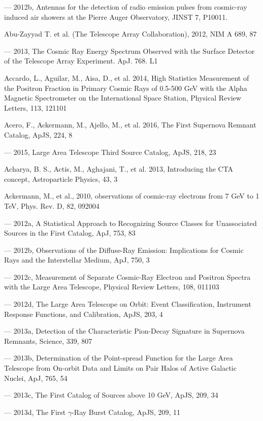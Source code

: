 --- 2012b, Antennas for the detection of radio emission pulses from cosmic-ray induced air showers at the Pierre Auger Observatory, JINST 7, P10011.

Abu-Zayyad T. et al. (The Telescope Array Collaboration), 2012, NIM A 689, 87

--- 2013, The Cosmic Ray Energy Spectrum Observed with the Surface Detector of the Telescope Array Experiment. ApJ. 768. L1

Accardo, L., Aguilar, M., Aisa, D., et al. 2014, High Statistics Measurement of the Positron Fraction in Primary Cosmic Rays of 0.5-500 GeV with the Alpha Magnetic Spectrometer on the International Space Station, Physical Review Letters, 113, 121101 

Acero, F., Ackermann, M., Ajello, M., et al. 2016, The First \fermilat{} Supernova Remnant Catalog, ApJS, 224, 8

--- 2015, \fermi{} Large Area Telescope Third Source Catalog, ApJS, 218, 23

Acharya, B. S., Actis, M., Aghajani, T., et al. 2013, Introducing the CTA concept, Astroparticle Physics, 43, 3

Ackermann, M., et al., 2010, \fermilat{} observations of cosmic-ray electrons from 7 GeV to 1 TeV, Phys. Rev. D, 82, 092004

--- 2012a, A Statistical Approach to Recognizing Source Classes for Unassociated Sources in the First \fermilat{} Catalog, ApJ, 753, 83

--- 2012b, \fermilat{} Observations of the Diffuse-Ray Emission: Implications for Cosmic Rays and the Interstellar Medium, ApJ, 750, 3

--- 2012c, Measurement of Separate Cosmic-Ray Electron and Positron Spectra with the \fermi{} Large Area Telescope, Physical Review Letters, 108, 011103

--- 2012d, The \fermi{} Large Area Telescope on Orbit: Event Classification, Instrument Response Functions, and Calibration, ApJS, 203, 4

--- 2013a, Detection of the Characteristic Pion-Decay Signature in Supernova Remnants, Science, 339, 807

--- 2013b, Determination of the Point-spread Function for the \fermi{} Large Area Telescope from On-orbit Data and Limits on Pair Halos of Active Galactic Nuclei, ApJ, 765, 54

--- 2013c, The First \fermilat{} Catalog of Sources above 10 GeV, ApJS, 209, 34

--- 2013d, The First \fermilat{} $\gamma$-Ray Burst Catalog, ApJS, 209, 11

